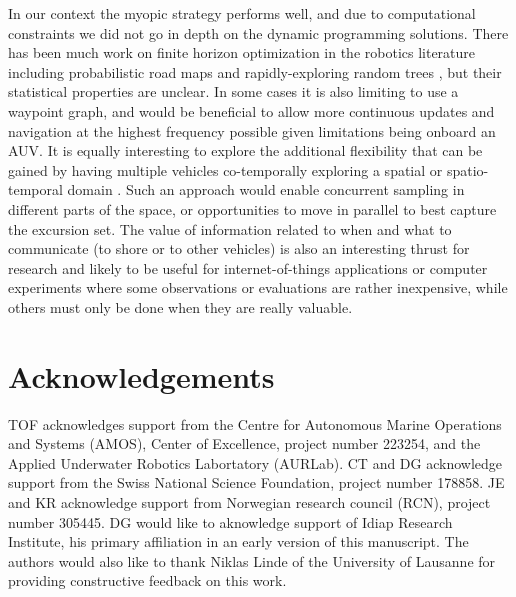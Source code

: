 \documentclass[aoas]{imsart}
\begin{document}
In our context the myopic strategy performs well, and due to
computational constraints we did not go in depth on the dynamic
programming solutions. There has been much work on finite horizon
optimization in the robotics literature including probabilistic road
maps and rapidly-exploring random trees \citep{karaman2011sampling},
but their statistical properties are unclear.  In some cases it is
also limiting to use a waypoint graph, and would be beneficial to
allow more continuous updates and navigation at the highest frequency
possible given limitations being onboard an AUV.  It is equally
interesting to explore the additional flexibility that can be gained
by having multiple vehicles co-temporally exploring a spatial or
spatio-temporal domain \citep{ferreira2019advancing}. Such an approach
would enable concurrent sampling in different parts of the space, or
opportunities to move in parallel to best capture the excursion set.
The value of information related to when and what to communicate (to
shore or to other vehicles) is also an interesting thrust for research
and likely to be useful for internet-of-things applications or
computer experiments where some observations or evaluations are rather
inexpensive, while others must only be done when they are really
valuable.



\section*{Acknowledgements}

TOF acknowledges support from the Centre for Autonomous Marine
Operations and Systems (AMOS), Center of Excellence, project number
223254, and the Applied Underwater Robotics Labortatory (AURLab). CT
and DG acknowledge support from the Swiss National Science Foundation,
project number 178858. JE and KR acknowledge support from Norwegian
research council (RCN), project number 305445. DG would like to
aknowledge support of Idiap Research Institute, his primary affiliation in an early version of this manuscript.  The authors would also
like to thank Niklas Linde of the University of Lausanne for providing constructive feedback on this work.
\end{document}
